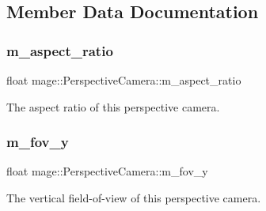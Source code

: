 \subsection{Member Data Documentation}
\hypertarget{classmage_1_1_perspective_camera_ab92d993fece777cfeca8d5c7d371ffc9}{}\label{classmage_1_1_perspective_camera_ab92d993fece777cfeca8d5c7d371ffc9} 
\subsubsection{\texorpdfstring{m\+\_\+aspect\+\_\+ratio}{m\_aspect\_ratio}}
{\footnotesize\ttfamily float mage\+::\+Perspective\+Camera\+::m\+\_\+aspect\+\_\+ratio\hspace{0.3cm}{\ttfamily [private]}}

The aspect ratio of this perspective camera. \hypertarget{classmage_1_1_perspective_camera_abdcf1a0cdd247e0f7e14e70898678af6}{}\label{classmage_1_1_perspective_camera_abdcf1a0cdd247e0f7e14e70898678af6} 
\subsubsection{\texorpdfstring{m\+\_\+fov\+\_\+y}{m\_fov\_y}}
{\footnotesize\ttfamily float mage\+::\+Perspective\+Camera\+::m\+\_\+fov\+\_\+y\hspace{0.3cm}{\ttfamily [private]}}

The vertical field-\/of-\/view of this perspective camera. 